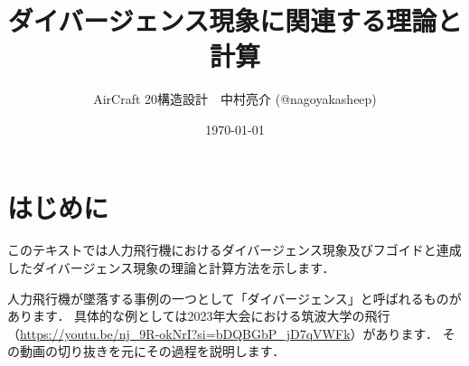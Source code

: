 \documentclass{jarticle}
\title{ダイバージェンス現象に関連する理論と計算}
\author{AirCraft 20構造設計　中村亮介 (@nagoyakasheep) }
\date{\today} %
\begin{document}
\maketitle

\section{はじめに}

このテキストでは人力飛行機におけるダイバージェンス現象及びフゴイドと連成したダイバージェンス現象の理論と計算方法を示します．

人力飛行機が墜落する事例の一つとして「ダイバージェンス」と呼ばれるものがあります．
具体的な例としては2023年大会における筑波大学の飛行（\url{https://youtu.be/nj_9R-okNrI?si=bDQBGbP_jD7qVWFk}）があります．
その動画の切り抜きを元にその過程を説明します．
\end{document}
